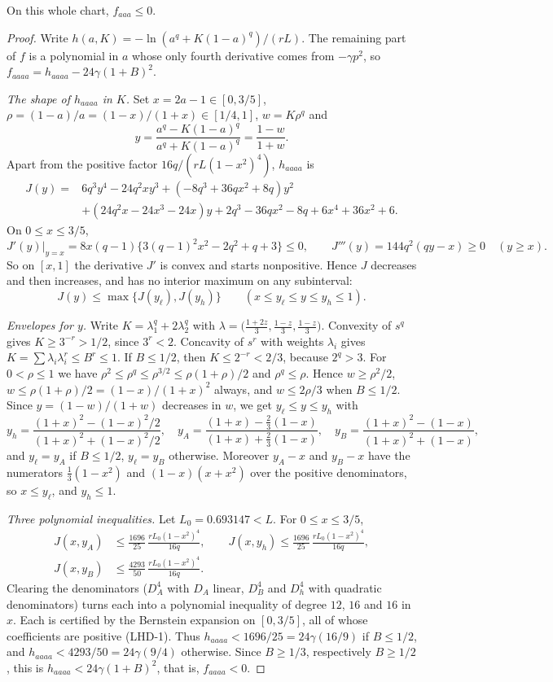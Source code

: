 \begin{lemma}\label{lem:fqe-large-head-curvature}
On this whole chart, $f_{aaa}\le0$.
\end{lemma}
\begin{proof}
Write $h(a,K)=-\ln(a^q+K(1-a)^q)/(rL)$. The remaining part of $f$ is a polynomial in $a$
whose only fourth derivative comes from $-\gamma p^2$, so
$f_{aaaa}=h_{aaaa}-24\gamma(1+B)^2$.

\emph{The shape of $h_{aaaa}$ in $K$.}
Set $x=2a-1\in[0,3/5]$, $\rho=(1-a)/a=(1-x)/(1+x)\in[1/4,1]$, $w=K\rho^q$ and
\[
 y=\frac{a^q-K(1-a)^q}{a^q+K(1-a)^q}=\frac{1-w}{1+w}.
\]
Apart from the positive factor $16q/(rL(1-x^2)^4)$, $h_{aaaa}$ is
\begin{align*}
 J(y)={}&6q^3y^4-24q^2xy^3+(-8q^3+36qx^2+8q)y^2\\
 &+(24q^2x-24x^3-24x)y+2q^3-36qx^2-8q+6x^4+36x^2+6.
\end{align*}
On $0\le x\le3/5$,
\[
 J'(y)\big|_{y=x}=8x(q-1)\{3(q-1)^2x^2-2q^2+q+3\}\le0,\qquad
 J'''(y)=144q^2(qy-x)\ge0\quad(y\ge x).
\]
So on $[x,1]$ the derivative $J'$ is convex and starts nonpositive. Hence $J$ decreases and then
increases, and has no interior maximum on any subinterval:
\[
 J(y)\le\max\{J(y_\ell),J(y_h)\}\qquad(x\le y_\ell\le y\le y_h\le1).
\]

\emph{Envelopes for $y$.}
Write $K=\lambda_1^q+2\lambda_2^q$ with $\lambda=\bigl(\frac{1+2z}3,\frac{1-z}3,\frac{1-z}3\bigr)$.
Convexity of $s^q$ gives $K\ge3^{-r}>1/2$, since $3^r<2$.
Concavity of $s^r$ with weights $\lambda_i$ gives $K=\sum\lambda_i\lambda_i^r\le B^r\le1$.
If $B\le1/2$, then $K\le2^{-r}<2/3$, because $2^q>3$.
For $0<\rho\le1$ we have $\rho^2\le\rho^q\le\rho^{3/2}\le\rho(1+\rho)/2$ and $\rho^q\le\rho$.
Hence $w\ge\rho^2/2$, $w\le\rho(1+\rho)/2=(1-x)/(1+x)^2$ always, and $w\le2\rho/3$ when $B\le1/2$.
Since $y=(1-w)/(1+w)$ decreases in $w$, we get $y_\ell\le y\le y_h$ with
\[
 y_h=\frac{(1+x)^2-(1-x)^2/2}{(1+x)^2+(1-x)^2/2},\quad
 y_A=\frac{(1+x)-\frac23(1-x)}{(1+x)+\frac23(1-x)},\quad
 y_B=\frac{(1+x)^2-(1-x)}{(1+x)^2+(1-x)},
\]
and $y_\ell=y_A$ if $B\le1/2$, $y_\ell=y_B$ otherwise.
Moreover $y_A-x$ and $y_B-x$ have the numerators $\frac13(1-x^2)$ and $(1-x)(x+x^2)$ over the
positive denominators, so $x\le y_\ell$, and $y_h\le1$.

\emph{Three polynomial inequalities.}
Let $L_0=0.693147<L$. For $0\le x\le3/5$,
\begin{align*}
 J(x,y_A)&\le\tfrac{1696}{25}\,\frac{rL_0(1-x^2)^4}{16q},\qquad
 J(x,y_h)\le\tfrac{1696}{25}\,\frac{rL_0(1-x^2)^4}{16q},\\
 J(x,y_B)&\le\tfrac{4293}{50}\,\frac{rL_0(1-x^2)^4}{16q}.
\end{align*}
Clearing the denominators ($D_A^4$ with $D_A$ linear, $D_B^4$ and $D_h^4$ with quadratic denominators)
turns each into a polynomial inequality of degree $12$, $16$ and $16$ in $x$.
Each is certified by the Bernstein expansion on $[0,3/5]$, all of whose coefficients are positive (LHD-1).
Thus $h_{aaaa}<1696/25=24\gamma(16/9)$ if $B\le1/2$, and $h_{aaaa}<4293/50=24\gamma(9/4)$ otherwise.
Since $B\ge1/3$, respectively $B\ge1/2$, this is $h_{aaaa}<24\gamma(1+B)^2$, that is, $f_{aaaa}<0$.


\end{proof}
